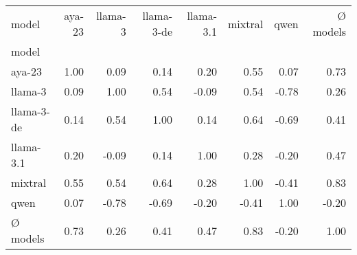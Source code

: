 \begin{tabular}{lrrrrrrr}
\toprule
model & aya-23 & llama-3 & llama-3-de & llama-3.1 & mixtral & qwen & Ø models \\
model &  &  &  &  &  &  &  \\
\midrule
aya-23 & 1.00 & 0.09 & 0.14 & 0.20 & 0.55 & 0.07 & 0.73 \\
llama-3 & 0.09 & 1.00 & 0.54 & -0.09 & 0.54 & -0.78 & 0.26 \\
llama-3-de & 0.14 & 0.54 & 1.00 & 0.14 & 0.64 & -0.69 & 0.41 \\
llama-3.1 & 0.20 & -0.09 & 0.14 & 1.00 & 0.28 & -0.20 & 0.47 \\
mixtral & 0.55 & 0.54 & 0.64 & 0.28 & 1.00 & -0.41 & 0.83 \\
qwen & 0.07 & -0.78 & -0.69 & -0.20 & -0.41 & 1.00 & -0.20 \\
Ø models & 0.73 & 0.26 & 0.41 & 0.47 & 0.83 & -0.20 & 1.00 \\
\bottomrule
\end{tabular}
